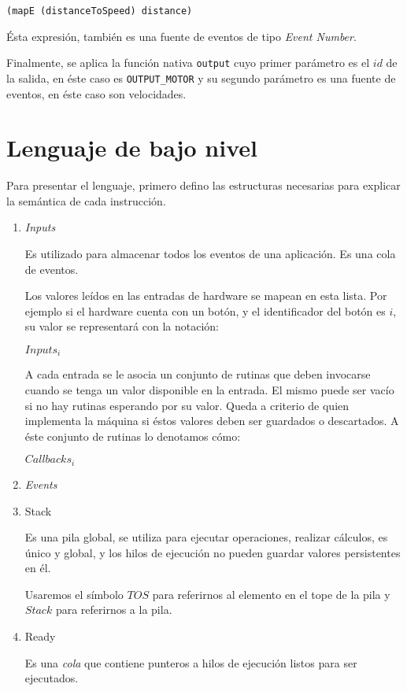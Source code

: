 \begin{verbatim}
(mapE (distanceToSpeed) distance)
\end{verbatim}

  Ésta expresión, también es una fuente de eventos
de tipo \emph{Event Number}.

  Finalmente, se aplica la función nativa \texttt{output} cuyo
primer parámetro es el $id$ de la salida, en éste caso es \texttt{OUTPUT\_MOTOR}
y su segundo parámetro es una fuente de eventos,
en éste caso son velocidades.



\section{Lenguaje de bajo nivel}

 Para presentar el lenguaje, primero defino las estructuras
necesarias para explicar la semántica de cada instrucción.

\begin{enumerate}

\item \emph{Inputs}

  
  Es utilizado para almacenar todos los eventos de una aplicación.
  Es una cola de eventos.

  

  Los valores leídos en las entradas de hardware se mapean
en esta lista. Por ejemplo si el hardware cuenta con un botón,
y el identificador del botón es $i$,
su valor se representará con la notación:

  $Inputs_i$

  A cada entrada se le asocia un conjunto de
rutinas que deben invocarse cuando se tenga un
valor disponible en la entrada. El mismo puede ser vacío si
no hay rutinas esperando por su valor. Queda a criterio de quien
implementa la máquina si éstos valores deben ser guardados o
descartados. 
  A éste conjunto de rutinas lo denotamos cómo:

  $Callbacks_i$

\item \emph{Events}


\item Stack

Es una pila global, se utiliza para ejecutar operaciones,
realizar cálculos, es único
y global, y los hilos de ejecución no pueden guardar valores
persistentes en él.

Usaremos el símbolo $TOS$ para referirnos al elemento en el tope
de la pila y $Stack$ para referirnos a la pila.

\item Ready

Es una \emph{cola} que contiene punteros a hilos de ejecución
listos para ser ejecutados.

\end{enumerate}

